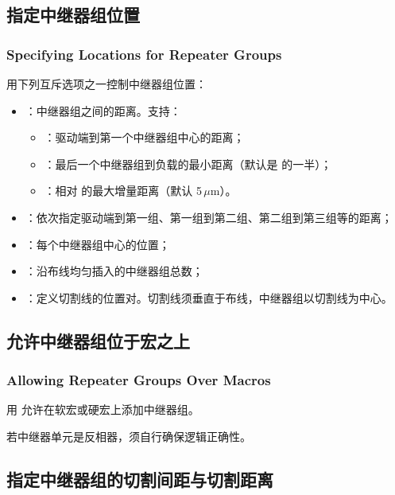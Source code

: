 \subsection{指定中继器组位置}
\subsubsection*{Specifying Locations for Repeater Groups}

用下列互斥选项之一控制中继器组位置：
\begin{itemize}
  \item {}：中继器组之间的距离。支持：
  \begin{itemize}
    \item {}：驱动端到第一个中继器组中心的距离；
    \item {}：最后一个中继器组到负载的最小距离（默认是  的一半）；
    \item {}：相对  的最大增量距离（默认 5\,$\mu$m）。
  \end{itemize}
  \item {}：依次指定驱动端到第一组、第一组到第二组、第二组到第三组等的距离；
  \item {}：每个中继器组中心的位置；
  \item {}：沿布线均匀插入的中继器组总数；
  \item {}：定义切割线的位置对。切割线须垂直于布线，中继器组以切割线为中心。
\end{itemize}

\subsection{允许中继器组位于宏之上}
\subsubsection*{Allowing Repeater Groups Over Macros}

用  允许在软宏或硬宏上添加中继器组。

\begin{noteBox}
若中继器单元是反相器，须自行确保逻辑正确性。
\end{noteBox}

\subsection{指定中继器组的切割间距与切割距离}
